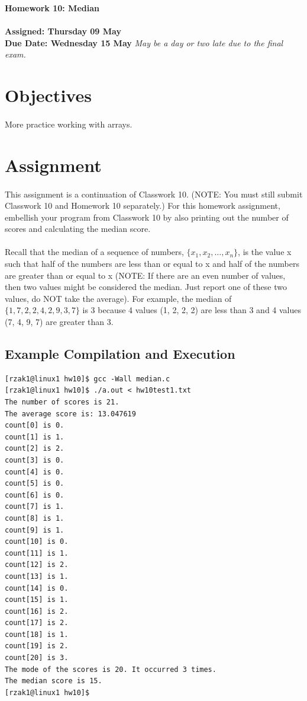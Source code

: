 \documentclass[letter,11pt]{article}
\begin{document}
\huge
\textbf{Homework 10: Median}
\normalsize
\\ ~~ \\
\textbf{Assigned: Thursday 09 May} \\
\textbf{Due Date: Wednesday 15 May}
\textit{May be a day or two late due to the final exam.}

\section*{Objectives}
\paragraph{}More practice working with arrays.

\section*{Assignment}
\paragraph{}This assignment is a continuation of Classwork 10. (NOTE: You must still submit Classwork 10 and Homework 10 separately.) For this homework assignment, embellish your program from Classwork 10 by also printing out the number of scores and calculating the median score.

\paragraph{}Recall that the median of a sequence of numbers, $\{x_1, x_2, \ldots, x_n\}$, is the value x such that half of the numbers are less than or equal to x and half of the numbers are greater than or equal to x (NOTE: If there are an even number of values, then two values might be considered the median. Just report one of these two values, do NOT take the average). For example, the median of $\{1, 7, 2, 2, 4, 2, 9, 3, 7\}$ is 3 because 4 values (1, 2, 2, 2) are less than 3 and 4 values (7, 4, 9, 7) are greater than 3.

\subsection*{Example Compilation and Execution}
\begin{verbatim}
[rzak1@linux1 hw10]$ gcc -Wall median.c
[rzak1@linux1 hw10]$ ./a.out < hw10test1.txt
The number of scores is 21.
The average score is: 13.047619
count[0] is 0.
count[1] is 1.
count[2] is 2.
count[3] is 0.
count[4] is 0.
count[5] is 0.
count[6] is 0.
count[7] is 1.
count[8] is 1.
count[9] is 1.
count[10] is 0.
count[11] is 1.
count[12] is 2.
count[13] is 1.
count[14] is 0.
count[15] is 1.
count[16] is 2.
count[17] is 2.
count[18] is 1.
count[19] is 2.
count[20] is 3.
The mode of the scores is 20. It occurred 3 times.
The median score is 15.
[rzak1@linux1 hw10]$
\end{verbatim}
\end{document}
